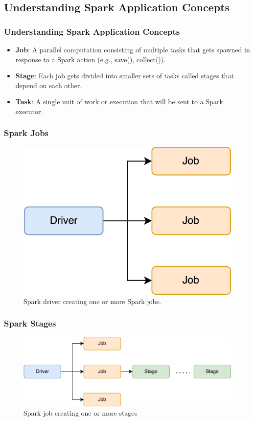\subsection{Understanding Spark Application Concepts}\label{subsec:understanding-spark-application-concepts}

\begin{frame}
    \frametitle{Understanding Spark Application Concepts}
    \begin{itemize}
        \item \textbf{Job}: A parallel computation consisting of multiple tasks that gets spawned in response
        to a Spark action (e.g., save(), collect()).
        \item \textbf{Stage}: Each job gets divided into smaller sets of tasks called stages that depend on each
        other.
        \item \textbf{Task}: A single unit of work or execution that will be sent to a Spark executor.
    \end{itemize}
\end{frame}
\begin{frame}
    \frametitle{Spark Jobs}
    \begin{figure}
        \includegraphics[width=\textwidth,height=.7\textheight,keepaspectratio]{./Figures/chapter-04/spark_job}
        \caption{Spark driver creating one or more Spark jobs.}\label{fig:spark_job}
    \end{figure}
\end{frame}
\begin{frame}
    \frametitle{Spark Stages}
    \begin{figure}
        \includegraphics[width=\textwidth,height=.65\textheight,keepaspectratio]{./Figures/chapter-04/Spark_Stages}
        \caption{Spark job creating one or more stages}\label{fig:spark_stages}
    \end{figure}
\end{frame}
